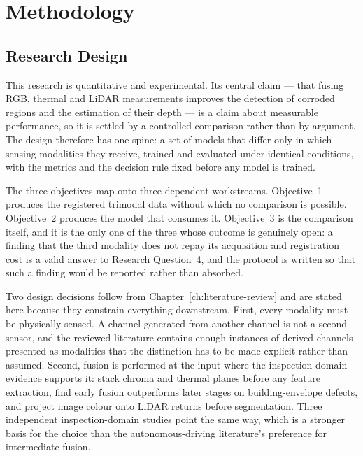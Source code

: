 \chapter[METHODOLOGY]{Methodology}
\label{ch:methodology}

\section{Research Design}
\label{sec:research-design}

This research is quantitative and experimental. Its central claim --- that
fusing RGB, thermal and LiDAR measurements improves the detection of corroded
regions and the estimation of their depth --- is a claim about measurable
performance, so it is settled by a controlled comparison rather than by
argument. The design therefore has one spine: a set of models that differ only
in which sensing modalities they receive, trained and evaluated under identical
conditions, with the metrics and the decision rule fixed before any model is
trained.

The three objectives map onto three dependent workstreams. Objective~1 produces
the registered trimodal data without which no comparison is possible.
Objective~2 produces the model that consumes it. Objective~3 is the comparison
itself, and it is the only one of the three whose outcome is genuinely open: a
finding that the third modality does not repay its acquisition and registration
cost is a valid answer to Research Question~4, and the protocol is written so
that such a finding would be reported rather than absorbed.

Two design decisions follow from Chapter~\ref{ch:literature-review} and are
stated here because they constrain everything downstream. First, every modality
must be physically sensed. A channel generated from another channel is not a
second sensor, and the reviewed literature contains enough instances of derived
channels presented as modalities that the distinction has to be made explicit
rather than assumed. Second, fusion is performed at the input where the
inspection-domain evidence supports it: \citet{Lim2021} stack chroma and thermal
planes before any feature extraction, \citet{Yang2023} find early fusion
outperforms later stages on building-envelope defects, and \citet{Maru2025}
project image colour onto LiDAR returns before segmentation. Three independent
inspection-domain studies point the same way, which is a stronger basis for the
choice than the autonomous-driving literature's preference for intermediate
fusion.


